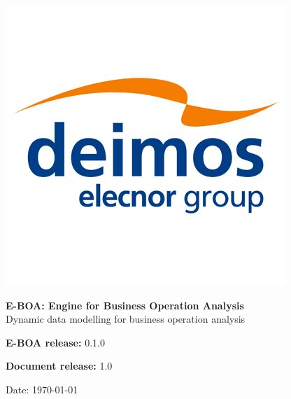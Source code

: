 %
%
%

\begin{titlepage}
	
    \includegraphics[scale=0.20]{../fig/deimos_logo.jpg}
    
    \vspace{2.0cm}
    
    	\begin{center}
    
    \vspace{2cm}
    
    \LARGE{\textbf{E-BOA: Engine for Business Operation Analysis}} \\    
    \LARGE{Dynamic data modelling for business operation analysis}
    
    	\end{center}    
    
    \vspace{7.0cm}

    \vspace{0.5cm}

    \Large{\textbf{E-BOA release:} 0.1.0}

    \Large{\textbf{Document release:} 1.0}

    \vspace{1cm}
    
    \large{Date: \today}
    
\end{titlepage}
